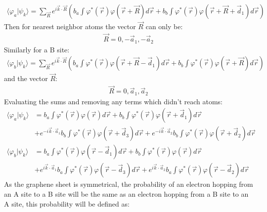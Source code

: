 			\begin{align}
				\langle\varphi_{a}|\psi_{k}\rangle=\sum\limits_{\vec{R}}e^{i\vec{k}\cdot\vec{R}}\left(b_{a}\int\varphi^{*}\left(\vec{r}\right)\varphi\left(\vec{r}+\vec{R}\right)d\vec{r}+b_{b}\int\varphi^{*}\left(\vec{r}\right)\varphi\left(\vec{r}+\vec{R}+\vec{d}_{1}\right)d\vec{r}\right)
				\label{introduction-start-tb}
			\end{align}
			Then for nearest neighbor atoms the vector $\vec{R}$ can only be:
			\begin{align}
				\vec{R}=0, -\vec{a}_{1}, -\vec{a}_{2}
			\end{align}
			Similarly for a B site:
			\begin{align}
				\langle\varphi_{b}|\psi_{k}\rangle=\sum\limits_{\vec{R}}e^{i\vec{k}\cdot\vec{R}}\left(b_{a}\int\varphi^{*}\left(\vec{r}\right)\varphi\left(\vec{r}+\vec{R}-\vec{d}_{1}\right)d\vec{r}+b_{b}\int\varphi^{*}\left(\vec{r}\right)\varphi\left(\vec{r}+\vec{R}\right)d\vec{r}\right)
				\label{introduction-start-tb-b}
			\end{align}
			and the vector $\vec{R}$:
			\begin{align}
				\vec{R}=0, \vec{a}_{1}, \vec{a}_{2}
			\end{align}
			Evaluating the sums and removing any terms which didn't reach atoms:
			\begin{align}
				\langle\varphi_{a}|\psi_{k}\rangle&=b_{a}\int\varphi^{*}\left(\vec{r}\right)\varphi\left(\vec{r}\right)d\vec{r}+b_{b}\int\varphi^{*}\left(\vec{r}\right)\varphi\left(\vec{r}+\vec{d}_{1}\right)d\vec{r}\\
				&+e^{-i\vec{k}\cdot\vec{a}_{1}}b_{b}\int\varphi^{*}\left(\vec{r}\right)\varphi\left(\vec{r}+\vec{d}_{3}\right)d\vec{r}+e^{-i\vec{k}\cdot\vec{a}_{2}}b_{b}\int\varphi^{*}\left(\vec{r}\right)\varphi\left(\vec{r}+\vec{d}_{2}\right)d\vec{r}\\
				\langle\varphi_{b}|\psi_{k}\rangle&=b_{a}\int\varphi^{*}\left(\vec{r}\right)\varphi\left(\vec{r}-\vec{d}_{1}\right)d\vec{r}+b_{b}\int\varphi^{*}\left(\vec{r}\right)\varphi\left(\vec{r}\right)d\vec{r}\\
				&+e^{i\vec{k}\cdot\vec{a}_{1}}b_{a}\int\varphi^{*}\left(\vec{r}\right)\varphi\left(\vec{r}-\vec{d}_{3}\right)d\vec{r}+e^{i\vec{k}\cdot\vec{a}_{2}}b_{a}\int\varphi^{*}\left(\vec{r}\right)\varphi\left(\vec{r}-\vec{d}_{2}\right)d\vec{r}
			\end{align}
			As the graphene sheet is symmetrical, the probability of an electron hopping from an A site to a B site will be the same as an electron hopping from a B site to an A site, this probability will be defined as:
